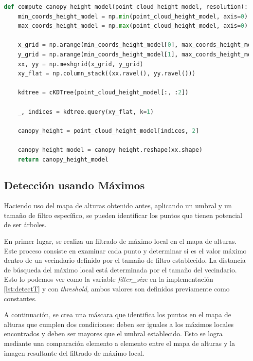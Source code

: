 \vspace{0.2cm}
\begin{lstlisting}[language=Python, caption={Código para obtener el mapa de alturas del dorsel }]
def compute_canopy_height_model(point_cloud_height_model, resolution):
    min_coords_height_model = np.min(point_cloud_height_model, axis=0)
    max_coords_height_model = np.max(point_cloud_height_model, axis=0)

    x_grid = np.arange(min_coords_height_model[0], max_coords_height_model[0], resolution)
    y_grid = np.arange(min_coords_height_model[1], max_coords_height_model[1], resolution)
    xx, yy = np.meshgrid(x_grid, y_grid)
    xy_flat = np.column_stack((xx.ravel(), yy.ravel()))

    kdtree = cKDTree(point_cloud_height_model[:, :2])

    _, indices = kdtree.query(xy_flat, k=1)

    canopy_height = point_cloud_height_model[indices, 2]

    canopy_height_model = canopy_height.reshape(xx.shape)
    return canopy_height_model
\end{lstlisting}


\subsection{Detección usando Máximos}

Haciendo uso del mapa de alturas obtenido antes, aplicando un umbral y un tamaño de filtro específico, se pueden identificar los puntos que tienen potencial de ser árboles.

En primer lugar, se realiza un filtrado de máximo local en el mapa de alturas. Este proceso consiste en examinar cada punto y determinar si es el valor máximo dentro de un vecindario definido por el tamaño de filtro establecido. La distancia de búsqueda del máximo local está determinada por el tamaño del vecindario. Esto lo podemos ver como la variable \textit{filter\_size} en la implementación \ref{lst:detectT} y con \textit{threshold}, ambos valores son definidos previamente como constantes.

A continuación, se crea una máscara que identifica los puntos en el mapa de alturas que cumplen dos condiciones: deben ser iguales a los máximos locales encontrados y deben ser mayores que el umbral establecido. Esto se logra mediante una comparación elemento a elemento entre el mapa de alturas y la imagen resultante del filtrado de máximo local.

